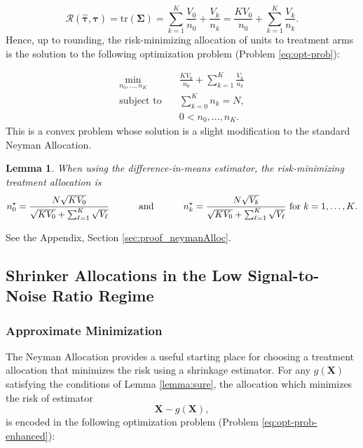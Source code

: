 \documentclass{article}
\newcommand{\bsX}{\boldsymbol X}
\newcommand{\bstau}{\boldsymbol \tau}
\newcommand{\hbstau}{\boldsymbol{\hat \tau}}
\newcommand{\bsSig}{\boldsymbol  \Sigma}
\newtheorem{lemma}{Lemma}
\newenvironment{proof*}
  {\renewcommand{\qedsymbol}{}\proof}
  {\endproof}
\newcommand{\Tr}{\text{tr}}
\begin{document}

\[ \mathcal{R}\left( \hbstau, \bstau \right) = \Tr(\bsSig) = \sum_{k = 1}^K \frac{V_0}{n_0} + \frac{V_k}{n_k} = \frac{K V_0}{n_0} + \sum_{k = 1}^K \frac{V_k}{n_k}.  \]
Hence, up to rounding, the risk-minimizing allocation of units to treatment arms is the solution to the following optimization problem (Problem \ref{eq:opt-prob}): 

\begin{equation}\label{eq:opt-prob}
\begin{aligned}
\min_{n_0,\dots,n_K}\quad & \frac{K V_0}{n_0} + \sum_{k=1}^K \frac{V_k}{n_k} \\
\text{subject to}\quad & \sum_{k = 0}^K n_k = N, \\
& 0 < n_0, \dots, n_K. 
\end{aligned}
\end{equation}
This is a convex problem whose solution is a slight modification to the standard Neyman Allocation. 

\begin{lemma}\label{lemma:neymanAlloc}
When using the difference-in-means estimator, the risk-minimizing treatment allocation is 
\[ n_0^\star = \frac{N \sqrt{K V_0}}{\sqrt{K V_0} + \sum_{\ell = 1}^K \sqrt{V_\ell}} \hspace{10mm} \text{ and } \hspace{10mm} n_k^\star = \frac{N \sqrt{V_k}}{\sqrt{K V_0} + \sum_{\ell = 1}^K \sqrt{V_\ell}} \text{ for $k = 1, \dots, K$.}  \]
\end{lemma}

\begin{proof*}
See the Appendix, Section \ref{sec:proof_neymanAlloc}.
\end{proof*}




\subsection{Shrinker Allocations in the Low Signal-to-Noise Ratio Regime}

\subsubsection{Approximate Minimization}

The Neyman Allocation provides a useful starting place for choosing a treatment allocation that minimizes the risk using a shrinkage estimator. For any $g(\bsX)$ satisfying the conditions of Lemma \ref{lemma:sure}, the allocation which minimizes the risk of estimator  
\[ \bsX - g(\bsX), \] 
is encoded in the following optimization problem (Problem \ref{eq:opt-prob-enhanced}):
\end{document}
